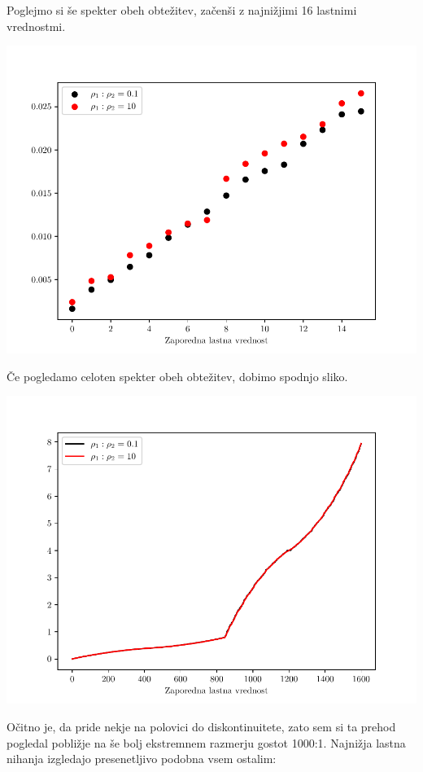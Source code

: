 Poglejmo si še spekter obeh obtežitev, začenši z najnižjimi 16 lastnimi vrednostmi.
\begin{center}
    \includegraphics[width=\textwidth]{../old/1-1-spekter-zoom_both.pdf}
\end{center}
Če pogledamo celoten spekter obeh obtežitev, dobimo spodnjo sliko.
\begin{center}
    \includegraphics[width=\textwidth]{../old/1-1-spekter_both.pdf}
\end{center}
Očitno je, da pride nekje na polovici do diskontinuitete, zato sem si ta prehod pogledal pobližje na še bolj ekstremnem razmerju gostot 1000:1. Najnižja lastna nihanja izgledajo presenetljivo podobna vsem ostalim:
